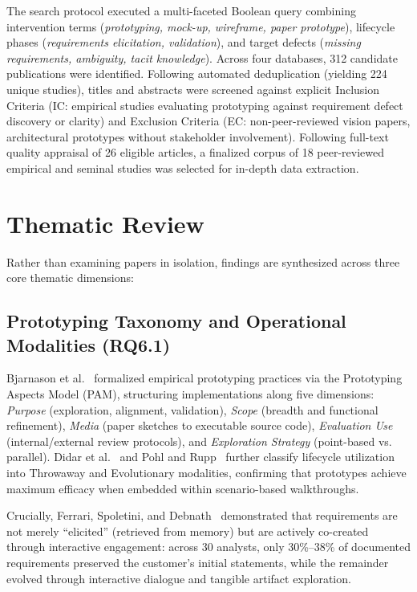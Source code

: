 \documentclass[conference]{IEEEtran}
\begin{document}
The search protocol executed a multi-faceted Boolean query combining intervention terms (\textit{prototyping, mock-up, wireframe, paper prototype}), lifecycle phases (\textit{requirements elicitation, validation}), and target defects (\textit{missing requirements, ambiguity, tacit knowledge}). Across four databases, 312 candidate publications were identified. Following automated deduplication (yielding 224 unique studies), titles and abstracts were screened against explicit Inclusion Criteria (IC: empirical studies evaluating prototyping against requirement defect discovery or clarity) and Exclusion Criteria (EC: non-peer-reviewed vision papers, architectural prototypes without stakeholder involvement). Following full-text quality appraisal of 26 eligible articles, a finalized corpus of 18 peer-reviewed empirical and seminal studies was selected for in-depth data extraction.

\section{Thematic Review}
Rather than examining papers in isolation, findings are synthesized across three core thematic dimensions:

\subsection{Prototyping Taxonomy and Operational Modalities (RQ6.1)}
Bjarnason et al.~\cite{bjarnason2023empirically} formalized empirical prototyping practices via the Prototyping Aspects Model (PAM), structuring implementations along five dimensions: \textit{Purpose} (exploration, alignment, validation), \textit{Scope} (breadth and functional refinement), \textit{Media} (paper sketches to executable source code), \textit{Evaluation Use} (internal/external review protocols), and \textit{Exploration Strategy} (point-based vs. parallel). Didar et al.~\cite{didar2018systematic} and Pohl and Rupp~\cite{bbau_re_book} further classify lifecycle utilization into Throwaway and Evolutionary modalities, confirming that prototypes achieve maximum efficacy when embedded within scenario-based walkthroughs.

Crucially, Ferrari, Spoletini, and Debnath~\cite{rej2022evolve} demonstrated that requirements are not merely ``elicited'' (retrieved from memory) but are actively co-created through interactive engagement: across 30 analysts, only 30\%--38\% of documented requirements preserved the customer's initial statements, while the remainder evolved through interactive dialogue and tangible artifact exploration.
\end{document}
